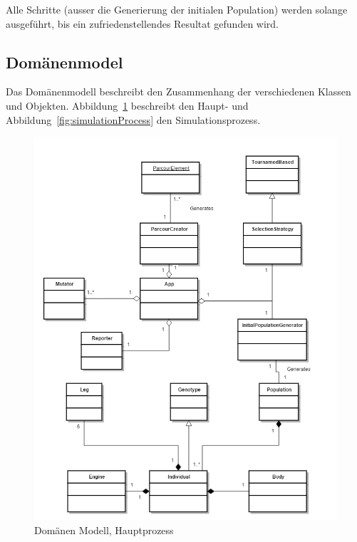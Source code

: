       Alle Schritte (ausser die Generierung der initialen Population) werden solange ausgeführt,
      bis ein zufriedenstellendes Resultat gefunden wird.

    \subsection{Domänenmodel\label{sub:domMod}}

      Das Domänenmodell beschreibt den Zusammenhang der verschiedenen Klassen und Objekten.
      Abbildung~\ref{fig:mainProcess} beschreibt den Haupt- und Abbildung~\ref{fig:simulationProcess} den Simulationsprozess.
      \begin{figure}[H]
        \includegraphics[scale=0.6]{graphics/main_process}
        \caption{Domänen Modell, Hauptprozess\label{fig:mainProcess}}
      \end{figure}
